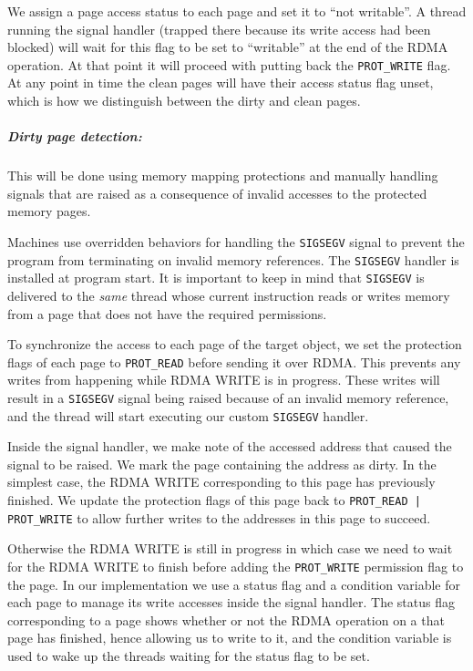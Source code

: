 We assign a page access status to each page and set it to ``not writable''. A
thread running the signal handler (trapped there because its write access had
been blocked) will wait for this flag to be set to ``writable''
at the end of the RDMA operation. At that point it will proceed with putting
back the \texttt{PROT\_WRITE} flag.
At any point in time the clean pages will have their access status flag unset,
which is how we distinguish between the dirty and clean pages.

\subparagraph{Dirty page detection:}
This will be done using memory mapping protections and manually
handling signals that
are raised as a consequence of invalid accesses to the protected memory pages.

Machines use overridden behaviors for handling the \texttt{SIGSEGV} signal
to prevent the program from terminating on invalid memory references.
The \texttt{SIGSEGV} handler is installed at program start.
It is important to keep in mind that
\texttt{SIGSEGV} is delivered
to the \emph{same} thread whose current instruction reads or writes memory
from a page that does not have the required permissions.

To synchronize the access to each page of the target object,
we set the protection flags of each page to \texttt{PROT\_READ} before sending
it over RDMA. This prevents any writes from happening while RDMA WRITE
is in progress. These writes will result in a \texttt{SIGSEGV} signal being
raised because of an invalid memory reference, and the thread will start
executing our custom \texttt{SIGSEGV} handler.

Inside the signal handler, we make note of the accessed address that
caused the signal to be raised. We mark the page containing the address as
dirty. In the simplest case, the RDMA WRITE corresponding to this page has
previously finished. We update the protection flags of this page back
to \texttt{PROT\_READ | PROT\_WRITE}
to allow further writes to the addresses in this page to succeed.

Otherwise the RDMA WRITE is still in progress in which case we need to wait for the
RDMA WRITE to finish before adding the \texttt{PROT\_WRITE} permission flag to
the page. In our
implementation we use a status flag and a condition variable for each page
to manage its write accesses inside the signal handler. The status flag
corresponding to a page shows whether or not the RDMA operation on a that page
has finished, hence allowing us to write to it, and the condition variable
is used to wake up the threads waiting for the status flag to be set.


